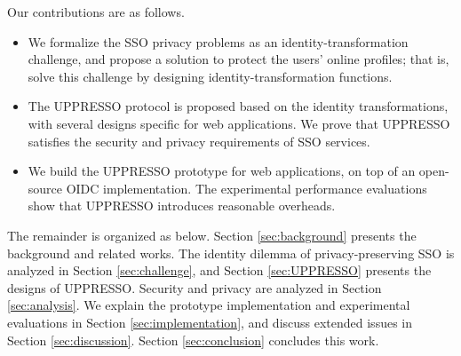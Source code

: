 %
%
Our contributions are as follows.
\vspace{-\topsep}\begin{itemize}
\setlength{\topsep}{0pt}
\setlength{\partopsep}{0pt}
\setlength{\itemsep}{0pt}
\setlength{\parsep}{0pt}
\setlength{\parskip}{0pt}
\item We formalize the SSO privacy problems as an identity-transformation challenge,
    and
propose a  solution to protect the users' online profiles;
    that is, solve this challenge by designing identity-transformation functions.
\item
The UPPRESSO protocol is proposed based on the identity transformations,
    with several designs specific for web applications.
We prove that UPPRESSO satisfies the security and privacy requirements of SSO services.


\item
We build the UPPRESSO prototype for web applications,
    on top of an open-source OIDC implementation.
The experimental performance evaluations show that UPPRESSO introduces reasonable overheads.
\end{itemize}


The remainder is organized as below.
Section \ref{sec:background} presents
    the background and related works.
The identity dilemma of privacy-preserving SSO is analyzed  in Section \ref{sec:challenge},
    and Section \ref{sec:UPPRESSO} presents the designs of UPPRESSO.
Security and privacy are analyzed in Section \ref{sec:analysis}.
We explain the prototype implementation and experimental evaluations in Section \ref{sec:implementation},
 and discuss extended issues in Section \ref{sec:discussion}.
Section \ref{sec:conclusion} concludes this work.
